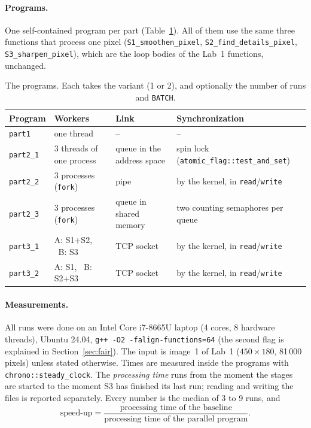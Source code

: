 \documentclass[11pt,a4paper]{article}
\begin{document}
\paragraph{Programs.} One self-contained program per part
(Table~\ref{tab:programs}). All of them use the same three functions that process one pixel
(\texttt{S1\_smoothen\_pixel}, \texttt{S2\_find\_details\_pixel}, \texttt{S3\_sharpen\_pixel}), which
are the loop bodies of the Lab~1 functions, unchanged.

\begin{table}[H]
\centering\small
\setlength{\tabcolsep}{5pt}
\begin{tabular}{@{}llll@{}}
\toprule
Program & Workers & Link & Synchronization \\
\midrule
\texttt{part1}    & one thread & -- & -- \\
\texttt{part2\_1} & 3 threads of one process & queue in the address space & spin lock (\texttt{atomic\_flag::test\_and\_set}) \\
\texttt{part2\_2} & 3 processes (\texttt{fork})   & pipe & by the kernel, in \texttt{read}/\texttt{write} \\
\texttt{part2\_3} & 3 processes (\texttt{fork})   & queue in shared memory & two counting semaphores per queue \\
\texttt{part3\_1} & A: S1+S2, \ B: S3 & TCP socket & by the kernel, in \texttt{read}/\texttt{write} \\
\texttt{part3\_2} & A: S1, \ B: S2+S3 & TCP socket & by the kernel, in \texttt{read}/\texttt{write} \\
\bottomrule
\end{tabular}
\caption{The programs. Each takes the variant (1 or 2), and optionally the number of runs and \texttt{BATCH}.}
\label{tab:programs}
\end{table}

\paragraph{Measurements.} All runs were done on an Intel Core i7-8665U laptop (4 cores, 8 hardware
threads), Ubuntu 24.04, \texttt{g++ -O2 -falign-functions=64} (the second flag is explained in
Section~\ref{sec:fair}). The input is image~1 of Lab~1 ($450\times180$, 81\,000
pixels) unless stated otherwise. Times are measured inside the programs with
\texttt{chrono::steady\_clock}. The \emph{processing time} runs from the moment the stages are
started to the moment S3 has finished its last run; reading and writing the files is reported
separately. Every number is the median of 3 to 9 runs, and
\[\text{speed-up} = \frac{\text{processing time of the baseline}}{\text{processing time of the parallel program}}.\]
\end{document}
